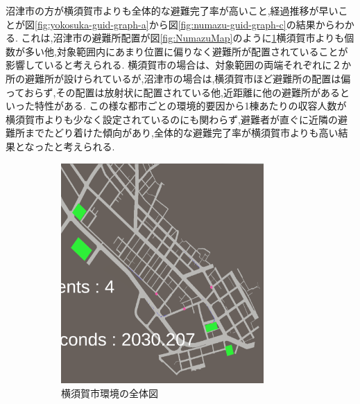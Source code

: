 沼津市の方が横須賀市よりも全体的な避難完了率が高いこと,経過推移が早いことが図\ref{fig:yokosuka-guid-graph-a}から図\ref{fig:numazu-guid-graph-c}の結果からわかる.
これは,沼津市の避難所配置が図\ref{fig:NumazuMap}のように\ref{fig:yokosukaMap}横須賀市よりも個数が多い他,対象範囲内にあまり位置に偏りなく避難所が配置されていることが影響していると考えられる.
横須賀市の場合は、対象範囲の両端それぞれに２か所の避難所が設けられているが,沼津市の場合は,横須賀市ほど避難所の配置は偏っておらず,その配置は放射状に配置されている他,近距離に他の避難所があるといった特性がある.
この様な都市ごとの環境的要因から1棟あたりの収容人数が横須賀市よりも少なく設定されているのにも関わらず,避難者が直ぐに近隣の避難所までたどり着けた傾向があり,全体的な避難完了率が横須賀市よりも高い結果となったと考えられる.
\begin{figure}[H]
  \centering
  \begin{subfigure}{0.45\textwidth}
      \centering
      \includegraphics[width=0.85\textwidth]{Figures/Yokosuka-Map.png}
      \caption{横須賀市環境の全体図}
      \label{fig:yokosukaMap}
  \end{subfigure}
  \begin{subfigure}{0.45\textwidth}
      \centering

\end{subfigure}
\end{figure}

